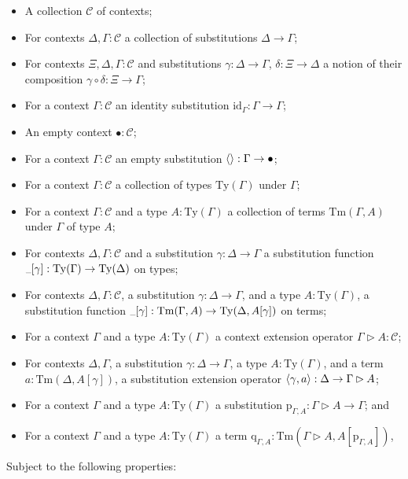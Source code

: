 \documentclass{article}
\renewcommand{\_}{\textrm{\textscale{.5}{\textunderscore}}}
\DeclarePairedDelimiter{\ctxt}{\langle}{\rangle}
\newcommand{\Tm}{\mathrm{Tm}}
\newcommand{\Ty}{\mathrm{Ty}}
\newcommand{\id}{\mathrm{id}}
\newcommand{\p}{\mathrm{p}}
\newcommand{\q}{\mathrm{q}}
\theoremstyle{definition}
\theoremstyle{plain}
\begin{document}
\begin{itemize}
    \item A collection $\mathcal{C}$ of contexts;
    \item For contexts $\Delta, \Gamma : \mathcal{C}$ a collection of substitutions $\Delta \to \Gamma$;
    \item For contexts $\Xi, \Delta, \Gamma : \mathcal{C}$ and substitutions $\gamma : \Delta \to \Gamma$, $\delta : \Xi \to \Delta$ a notion of their composition $\gamma \circ \delta : \Xi \to \Gamma$;
    \item For a context $\Gamma : \mathcal{C}$ an identity substitution $\id_{\Gamma} : \Gamma \to \Gamma$;
    \item An empty context $\bullet : \mathcal{C}$;
    \item For a context $\Gamma : \mathcal{C}$ an empty substitution $\ctxt{} : \Gamma \to \bullet$;
    \item For a context $\Gamma : \mathcal{C}$ a collection of types $\Ty(\Gamma)$ under $\Gamma$;
    \item For a context $\Gamma : \mathcal{C}$ and a type $A : \Ty(\Gamma)$ a collection of terms $\Tm(\Gamma, A)$ under $\Gamma$ of type $A$;
    \item For contexts $\Delta, \Gamma : \mathcal{C}$ and a substitution $\gamma : \Delta \to \Gamma$ a substitution function $\_[\gamma] : \Ty(\Gamma) \to \Ty(\Delta)$ on types;
    \item For contexts $\Delta, \Gamma : \mathcal{C}$, a substitution $\gamma : \Delta \to \Gamma$, and a type $A : \Ty(\Gamma)$, a substitution function $\_[\gamma] : \Tm(\Gamma, A) \to \Ty(\Delta, A[\gamma])$ on terms;
    \item For a context $\Gamma$ and a type $A : \Ty(\Gamma)$ a context extension operator $\Gamma \rhd A : \mathcal{C}$;
    \item For contexts $\Delta, \Gamma$, a substitution $\gamma : \Delta \to \Gamma$,
    a type $A : \Ty(\Gamma)$, and a term $a : \Tm(\Delta, A[\gamma])$,
    a substitution extension operator $\ctxt{\gamma, a} : \Delta \to \Gamma \rhd A$;
    \item For a context $\Gamma$ and a type $A : \Ty(\Gamma)$ a substitution $\p_{\Gamma, A} : \Gamma \rhd A \to \Gamma$; and
    \item For a context $\Gamma$ and a type $A : \Ty(\Gamma)$ a term $\q_{\Gamma, A} : \Tm(\Gamma \rhd A, A[\p_{\Gamma, A}])$,
\end{itemize}

Subject to the following properties:
\end{document}
